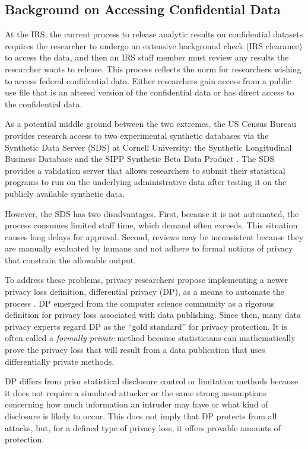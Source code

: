 \subsection{Background on Accessing Confidential Data}\label{subsec:background}
At the IRS, the current process to release analytic results on confidential datasets requires the researcher to undergo an extensive background check (IRS clearance) to access the data, and then an IRS staff member must review any results the researcher wants to release. This process reflects the norm for researchers wishing to access federal confidential data. Either researchers gain access from a public use file that is an altered version of the confidential data or has direct access to the confidential data.

As a potential middle ground between the two extremes, the US Census Bureau provides research access to two experimental synthetic databases via the Synthetic Data Server (SDS) at Cornell University: the Synthetic Longitudinal Business Database and the SIPP Synthetic Beta Data Product \citep{benedetto2013creation,drechsler2014synthetic}. The SDS provides a validation server that allows researchers to submit their statistical programs to run on the underlying administrative data after testing it on the publicly available synthetic data.

However, the SDS has two disadvantages. First, because it is not automated, the process consumes limited staff time, which demand often exceeds. This situation causes long delays for approval. Second, reviews may be inconsistent because they are manually evaluated by humans and not adhere to formal notions of privacy that constrain the allowable output.

To address these problems, privacy researchers propose implementing a newer privacy loss definition, differential privacy (DP), as a means to automate the process \citep{dwork2006calibrating}. DP emerged from the computer science community as a rigorous definition for privacy loss associated with data publishing. Since then, many data privacy experts regard DP as the ``gold standard'' for privacy protection. It is often called a \textit{formally private} method because statisticians can mathematically prove the privacy loss that will result from a data publication that uses differentially private methods.

DP differs from prior statistical disclosure control or limitation methods because it does not require a simulated attacker or the same strong assumptions concerning how much information an intruder may have or what kind of disclosure is likely to occur. This does not imply that DP protects from all attacks, but, for a defined type of privacy loss, it offers provable amounts of protection.

